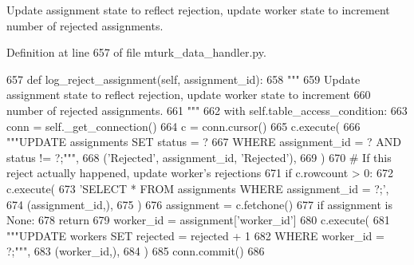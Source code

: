 \begin{DoxyVerb}Update assignment state to reflect rejection, update worker state to increment
number of rejected assignments.
\end{DoxyVerb}
 

Definition at line 657 of file mturk\+\_\+data\+\_\+handler.\+py.


\begin{DoxyCode}
657     \textcolor{keyword}{def }log\_reject\_assignment(self, assignment\_id):
658         \textcolor{stringliteral}{"""}
659 \textcolor{stringliteral}{        Update assignment state to reflect rejection, update worker state to increment}
660 \textcolor{stringliteral}{        number of rejected assignments.}
661 \textcolor{stringliteral}{        """}
662         with self.table\_access\_condition:
663             conn = self.\_get\_connection()
664             c = conn.cursor()
665             c.execute(
666                 \textcolor{stringliteral}{"""UPDATE assignments SET status = ?}
667 \textcolor{stringliteral}{                         WHERE assignment\_id = ? AND status != ?;"""},
668                 (\textcolor{stringliteral}{'Rejected'}, assignment\_id, \textcolor{stringliteral}{'Rejected'}),
669             )
670             \textcolor{comment}{# If this reject actually happened, update worker's rejections}
671             \textcolor{keywordflow}{if} c.rowcount > 0:
672                 c.execute(
673                     \textcolor{stringliteral}{'SELECT * FROM assignments WHERE assignment\_id = ?;'},
674                     (assignment\_id,),
675                 )
676                 assignment = c.fetchone()
677                 \textcolor{keywordflow}{if} assignment \textcolor{keywordflow}{is} \textcolor{keywordtype}{None}:
678                     \textcolor{keywordflow}{return}
679                 worker\_id = assignment[\textcolor{stringliteral}{'worker\_id'}]
680                 c.execute(
681                     \textcolor{stringliteral}{"""UPDATE workers SET rejected = rejected + 1}
682 \textcolor{stringliteral}{                             WHERE worker\_id = ?;"""},
683                     (worker\_id,),
684                 )
685             conn.commit()
686 
\end{DoxyCode}
\mbox{\label{classparlai_1_1mturk_1_1core_1_1mturk__data__handler_1_1MTurkDataHandler_a532f8c2794a6eccf008e7ed9c945e2cb}} 
